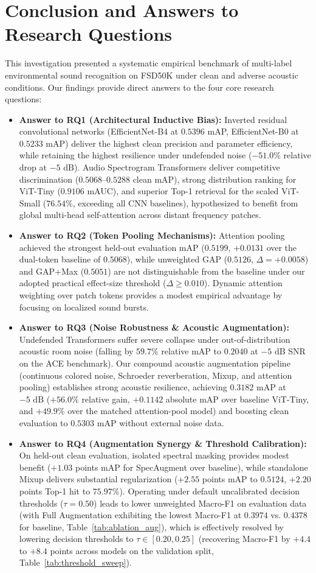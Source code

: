 \documentclass[11pt,a4paper]{article}
\begin{document}
\section{Conclusion and Answers to Research Questions}
This investigation presented a systematic empirical benchmark of multi-label environmental sound recognition on FSD50K under clean and adverse acoustic conditions. Our findings provide direct answers to the four core research questions:
\begin{itemize}
    \item \textbf{Answer to RQ1 (Architectural Inductive Bias):} Inverted residual convolutional networks (EfficientNet-B4 at $0.5396$ mAP, EfficientNet-B0 at $0.5233$ mAP) deliver the highest clean precision and parameter efficiency, while retaining the highest resilience under undefended noise ($-51.0\%$ relative drop at $-5\text{ dB}$). Audio Spectrogram Transformers deliver competitive discrimination ($0.5068\text{--}0.5288$ clean mAP), strong distribution ranking for ViT-Tiny ($0.9106$ mAUC), and superior Top-1 retrieval for the scaled ViT-Small ($76.54\%$, exceeding all CNN baselines), hypothesized to benefit from global multi-head self-attention across distant frequency patches.
    \item \textbf{Answer to RQ2 (Token Pooling Mechanisms):} Attention pooling achieved the strongest held-out evaluation mAP ($0.5199$, $+0.0131$ over the dual-token baseline of $0.5068$), while unweighted GAP ($0.5126$, $\Delta = +0.0058$) and GAP+Max ($0.5051$) are not distinguishable from the baseline under our adopted practical effect-size threshold ($\Delta \ge 0.010$). Dynamic attention weighting over patch tokens provides a modest empirical advantage by focusing on localized sound bursts.
    \item \textbf{Answer to RQ3 (Noise Robustness \& Acoustic Augmentation):} Undefended Transformers suffer severe collapse under out-of-distribution acoustic room noise (falling by $59.7\%$ relative mAP to $0.2040$ at $-5\text{ dB}$ SNR on the ACE benchmark). Our compound acoustic augmentation pipeline (continuous colored noise, Schroeder reverberation, Mixup, and attention pooling) establishes strong acoustic resilience, achieving $0.3182$ mAP at $-5\text{ dB}$ ($+56.0\%$ relative gain, $+0.1142$ absolute mAP over baseline ViT-Tiny, and $+49.9\%$ over the matched attention-pool model) and boosting clean evaluation to $0.5303$ mAP without external noise data.
    \item \textbf{Answer to RQ4 (Augmentation Synergy \& Threshold Calibration):} On held-out clean evaluation, isolated spectral masking provides modest benefit ($+1.03$ points mAP for SpecAugment over baseline), while standalone Mixup delivers substantial regularization ($+2.55$ points mAP to $0.5124$, $+2.20$ points Top-1 hit to $75.97\%$). Operating under default uncalibrated decision thresholds ($\tau=0.50$) leads to lower unweighted Macro-F1 on evaluation data (with Full Augmentation exhibiting the lowest Macro-F1 at $0.3974$ vs. $0.4378$ for baseline, Table~\ref{tab:ablation_aug}), which is effectively resolved by lowering decision thresholds to $\tau \in [0.20, 0.25]$ (recovering Macro-F1 by $+4.4$ to $+8.4$ points across models on the validation split, Table~\ref{tab:threshold_sweep}).

\end{itemize}
\end{document}

